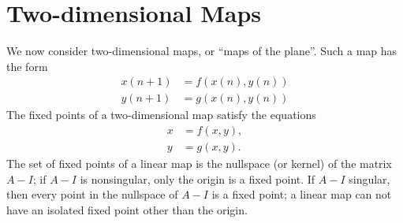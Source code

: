 \section{Two-dimensional Maps}
We now consider two-dimensional maps, or ``maps of the plane''.
Such a map has the form
\begin{equation}
\begin{split}
    x(n+1) & = f(x(n),y(n)) \\
    y(n+1) & = g(x(n),y(n))
\end{split}
\label{eqn:map}
\end{equation}
%
The fixed points of a two-dimensional map satisfy the equations
\begin{equation}
\begin{split}
   x & = f(x,y), \\
   y & = g(x,y).
\end{split}
\label{eqn:twodimfixedpoints}
\end{equation}
The set of fixed points of a linear map is
the nullspace (or kernel) of the matrix $A-I$; if
$A-I$ is nonsingular, only the origin is a fixed point.
If $A-I$ singular, then every point in the nullspace of $A-I$
is a fixed point;  a linear map can not have an
isolated fixed point other than the origin.

